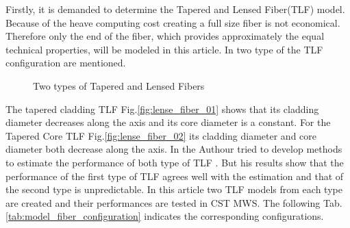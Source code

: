 

Firstly, it is demanded to determine the Tapered and Lensed Fiber(TLF) model. Because of the heave computing cost creating a full size fiber is not economical. Therefore only the end of the fiber, which provides approximately the equal technical properties, will be modeled in this article. In \cite{TLF_analysis} \cite{TLF_mode_transforming} two type of the TLF configuration are mentioned. 


\begin{figure}
\centering
{}
\hfill
{}
\label{fig:two_TLF}
\caption{Two types of Tapered and Lensed Fibers}
\end{figure}

The tapered cladding TLF Fig.\quad\ref{fig:lense_fiber_01} shows that its cladding diameter decreases along the axis and its core diameter is a constant. For the Tapered Core TLF Fig.\quad\ref{fig:lense_fiber_02} its cladding diameter and core diameter both decrease along the axis. In \cite{TLF_mode_transforming} the Authour tried to develop methods to estimate the performance of both type of TLF .  But his results show that the performance of the first type of TLF agrees well with the estimation and that of the second type is unpredictable. 
In this article two TLF models from each type are created and their performances are tested in CST MWS. The following Tab.\quad\ref{tab:model_fiber_configuration} indicates the corresponding configurations.


